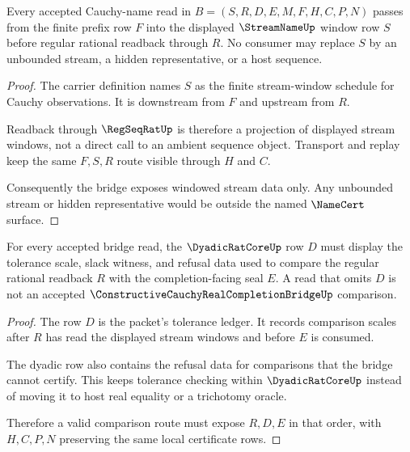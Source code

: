 \begin{theorem}
\label{thm:constructive-cauchy-real-completion-bridge-stream-window}
Every accepted Cauchy-name read in $B=(S,R,D,E,M,F,H,C,P,N)$ passes from the finite prefix row $F$ into the displayed $\StreamNameUp$ window row $S$ before regular rational readback through $R$. No consumer may replace $S$ by an unbounded stream, a hidden representative, or a host sequence.
\end{theorem}
\begin{proof}
The carrier definition names $S$ as the finite stream-window schedule for Cauchy observations. It is downstream from $F$ and upstream from $R$.

Readback through $\RegSeqRatUp$ is therefore a projection of displayed stream windows, not a direct call to an ambient sequence object. Transport and replay keep the same $F,S,R$ route visible through $H$ and $C$.

Consequently the bridge exposes windowed stream data only. Any unbounded stream or hidden representative would be outside the named $\NameCert$ surface.
\end{proof}

\begin{theorem}
\label{thm:constructive-cauchy-real-completion-bridge-dyadic-tolerance}
For every accepted bridge read, the $\DyadicRatCoreUp$ row $D$ must display the tolerance scale, slack witness, and refusal data used to compare the regular rational readback $R$ with the completion-facing seal $E$. A read that omits $D$ is not an accepted $\ConstructiveCauchyRealCompletionBridgeUp$ comparison.
\end{theorem}
\begin{proof}
The row $D$ is the packet's tolerance ledger. It records comparison scales after $R$ has read the displayed stream windows and before $E$ is consumed.

The dyadic row also contains the refusal data for comparisons that the bridge cannot certify. This keeps tolerance checking within $\DyadicRatCoreUp$ instead of moving it to host real equality or a trichotomy oracle.

Therefore a valid comparison route must expose $R,D,E$ in that order, with $H,C,P,N$ preserving the same local certificate rows.
\end{proof}

